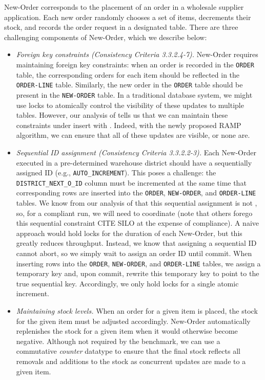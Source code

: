 New-Order corresponds to the placement of an order in a wholesale
supplier application. Each new order randomly chooses a set of items,
decrements their stock, and records the order request in a designated
table. There are three challenging components of New-Order, which we
describe below:
\begin{itemize}

\item \textit{Foreign key constraints (Consistency Criteria
  3.3.2.4-7).} New-Order requires maintaining foreign key constraints:
  when an order is recorded in the \texttt{ORDER} table, the
  corresponding orders for each item should be reflected in the
  \texttt{ORDER-LINE} table. Similarly, the new order in the
  \texttt{ORDER} table should be present in the \texttt{NEW-ORDER}
  table. In a traditional database system, we might use locks to
  atomically control the visibility of these updates to multiple
  tables. However, our analysis of \lang tells us that we can maintain
  these constraints under insert with \cfreedom. Indeed, with the
  newly proposed \cfree RAMP algorithm, we can ensure that all of
  these updates are visible, or none are.

\item \textit{Sequential ID assignment (Consistency Criteria
  3.3.2.2-3).} Each New-Order executed in a pre-determined warehouse
  district should have a sequentially assigned ID (e.g.,
  \texttt{AUTO\_INCREMENT}). This poses a challenge: the
  \texttt{DISTRICT\_NEXT\_O\_ID} column must be incremented at the
  same time that corresponding rows are inserted into the
  \texttt{ORDER}, \texttt{NEW-ORDER}, and \texttt{ORDER-LINE}
  tables. We know from our analysis of \lang that this sequential
  assignment is not \cfree, so, for a compliant run, we will need to
  coordinate (note that others forego this sequential constraint CITE
  SILO at the expense of compliance). A naive approach would hold
  locks for the duration of each New-Order, but this greatly reduces
  throughput. Instead, we know that assigning a sequential ID cannot
  abort, so we simply wait to assign an order ID until commit. When
  inserting rows into the \texttt{ORDER}, \texttt{NEW-ORDER}, and
  \texttt{ORDER-LINE} tables, we assign a temporary key and, upon
  commit, rewrite this temporary key to point to the true sequential
  key. Accordingly, we only hold locks for a single atomic increment.

\item \textit{Maintaining stock levels.} When an order for a given
  item is placed, the stock for the given item must be adjusted
  accordingly. New-Order automatically replenishes the stock for a
  given item when it would otherwise become negative. Although not
  required by the benchmark, we can use a commutative \textit{counter}
  datatype to ensure that the final stock reflects all removals and
  additions to the stock as concurrent updates are made to a given item.
\end{itemize}

